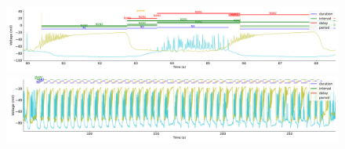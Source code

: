 \begin{figure}[htbp]
	\centering
	\begin{minipage}[b]{\textwidth}
		\centering
		\includegraphics[width=\textwidth]{./invariants/data/SUSSEX/CV1a_driven1/images/stim_cv1a1_3phases_signal_intervals_cycle.pdf}
		\includegraphics[width=\textwidth]{./invariants/data/SUSSEX/CV1a_driven1/images/stim_cv1a1_3phases_signal_intervals_zoom.pdf}
	\end{minipage}
	\centering
	\begin{minipage}[b]{0.45\textwidth}
		\centering

\end{minipage}
\end{figure}
